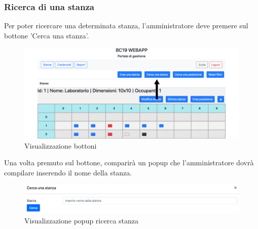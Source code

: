\subsubsection{Ricerca di una stanza}
Per poter ricercare una determinata stanza, l'amministratore deve premere sul bottone 'Cerca una stanza'.
\begin{figure}[H]
	\centering
	\includegraphics[width=15cm]{res/images/bottoneSearchRoom.png}
	\caption{Visualizzazione bottoni}
\end{figure}
Una volta premuto sul bottone, comparirà un popup che l'amministratore dovrà compilare inserendo il nome della stanza.
\begin{figure}[H]
	\centering
	\includegraphics[width=15cm]{res/images/searchRoom.png}
	\caption{Visualizzazione popup ricerca stanza}
\end{figure}

